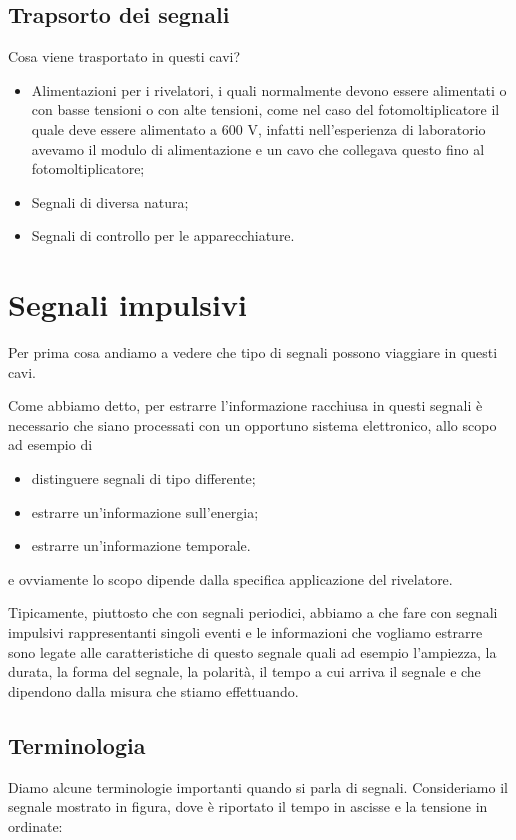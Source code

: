 \subsection{Trapsorto dei segnali}

Cosa viene trasportato in questi cavi?

\begin{itemize}[leftmargin=0.5cm]
   \item Alimentazioni per i rivelatori, i quali normalmente devono essere alimentati o con basse tensioni o con alte tensioni, come nel caso del fotomoltiplicatore il quale deve essere alimentato a 600 V, infatti nell'esperienza di laboratorio avevamo il modulo di alimentazione e un cavo che collegava questo fino al fotomoltiplicatore;
   \item Segnali di diversa natura;
   \item Segnali di controllo per le apparecchiature.
\end{itemize}

\vfill

\section{Segnali impulsivi}
Per prima cosa andiamo a vedere che tipo di segnali possono viaggiare in questi cavi.

Come abbiamo detto, per estrarre l'informazione racchiusa in questi segnali è necessario che siano processati con un opportuno sistema elettronico, allo scopo ad esempio di
\begin{itemize}[leftmargin=0.5cm]
   \item distinguere segnali di tipo differente;
   \item estrarre un'informazione sull'energia;
   \item estrarre un'informazione temporale.
\end{itemize}
e ovviamente lo scopo dipende dalla specifica applicazione del rivelatore.

Tipicamente, piuttosto che con segnali periodici, abbiamo a che fare con segnali impulsivi rappresentanti singoli eventi e le informazioni che vogliamo estrarre sono legate alle caratteristiche di questo segnale quali ad esempio l'ampiezza, la durata, la forma del segnale, la polarità, il tempo a cui arriva il segnale e che dipendono dalla misura che stiamo effettuando.

\subsection{Terminologia}
Diamo alcune terminologie importanti quando si parla di segnali. Consideriamo il segnale mostrato in figura, dove è riportato il tempo in ascisse e la tensione in ordinate:

